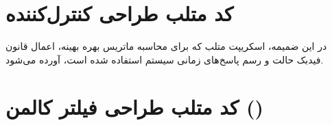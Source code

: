 \documentclass[a4paper,12pt]{article}
\newenvironment{LTRlisting}
  {\begin{latin}\begin{LTR}}
  {\end{LTR}\end{latin}}
\begin{document}
\section{کد متلب طراحی کنترل‌کننده }
\label{app:lqr_code}

در این ضمیمه، اسکریپت متلب  که برای محاسبه ماتریس بهره بهینه، اعمال قانون فیدبک حالت و رسم پاسخ‌های زمانی سیستم استفاده شده است، آورده می‌شود.

\begin{LTRlisting}
    
\end{LTRlisting}

\section{کد متلب طراحی فیلتر کالمن ()}
\label{app:kalman_code}

\begin{LTRlisting}
    
\end{LTRlisting}
\end{document}
